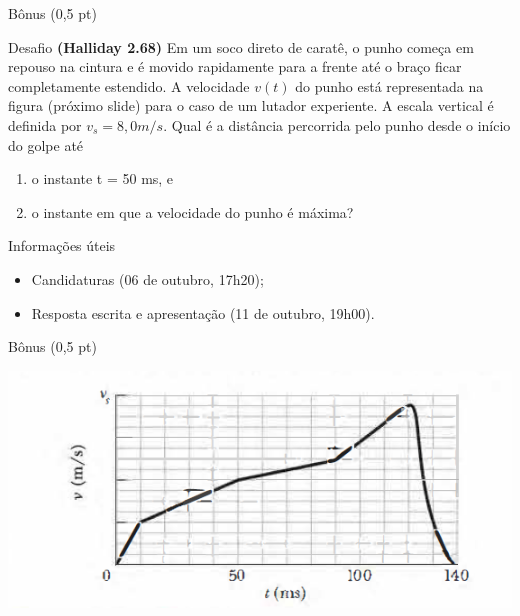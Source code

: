 \documentclass[xcolor=dvipsnames,table]{beamer}
\begin{document}
	\begin{frame}[shrink]{Bônus (0,5 pt)}
		\begin{block}{Desafio}
			{\bf (Halliday 2.68)} Em um soco direto de caratê, o punho começa em repouso na cintura e é movido rapidamente para a frente até o braço ficar completamente estendido. A velocidade $v(t)$ do punho está representada na figura (próximo slide) para o caso de um lutador experiente. A escala vertical é definida por $v_s = 8,0 m/s$. Qual é a distância percorrida pelo punho desde o início do golpe até
			\begin{enumerate}
				\item o instante t = 50 ms, e 
				\item o instante em que a velocidade do punho é máxima?
			\end{enumerate} 
		\end{block} \pause
		\begin{block}{Informações úteis}
			\begin{itemize}
                \item Candidaturas (06 de outubro, 17h20);
                \item Resposta escrita e apresentação (11 de outubro, 19h00).
			\end{itemize}
		\end{block} 
	\end{frame}
	
	\begin{frame}{Bônus (0,5 pt)}
		\begin{center}
			\includegraphics[scale=0.5]{images/bonus.png}
		\end{center}
	\end{frame}
	
	\begin{frame}
		\titlepage
	\end{frame}
	
\end{document}
